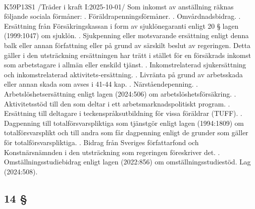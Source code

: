 \documentclass[a4paper,notitlepage,openany,10pt]{book}
\begin{document}
\paragraph*{}
{\tiny K59P13S1}
/Träder i kraft I:2025-10-01/
Som inkomst av anställning räknas följande sociala förmåner:
. Föräldrapenningsförmåner.
. Omvårdnadsbidrag.
. Ersättning från Försäkringskassan i form av sjuklönegaranti enligt 20 § lagen (1999:1047) om sjuklön.
. Sjukpenning eller motsvarande ersättning enligt denna balk eller annan författning eller på grund av särskilt beslut av regeringen. Detta gäller i den utsträckning ersättningen har trätt i stället för en försäkrads inkomst som arbetstagare i allmän eller enskild tjänst.
. Inkomstrelaterad sjukersättning och inkomstrelaterad aktivitets-ersättning.
. Livränta på grund av arbetsskada eller annan skada som avses i 41-44 kap.
. Närståendepenning.
. Arbetslöshetsersättning enligt lagen (2024:506) om arbetslöshetsförsäkring.
. Aktivitetsstöd till den som deltar i ett arbetsmarknadspolitiskt program.
. Ersättning till deltagare i teckenspråksutbildning för vissa föräldrar (TUFF).
. Dagpenning till totalförsvarspliktiga som tjänstgör enligt lagen (1994:1809) om totalförsvarsplikt och till andra som får dagpenning enligt de grunder som gäller för totalförsvarspliktiga.
. Bidrag från Sveriges författarfond och Konstnärsnämnden i den utsträckning som regeringen föreskriver det.
. Omställningsstudiebidrag enligt lagen (2022:856) om omställningsstudiestöd.
Lag (2024:508).
\subsection*{14 §}
\end{document}
